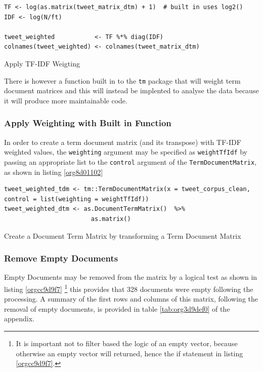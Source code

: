 \documentclass[11pt]{article}
\begin{document}
\begin{enumerate}
\begin{listing}[htbp]
\begin{verbatim}
TF <- log(as.matrix(tweet_matrix_dtm) + 1)  # built in uses log2()
IDF <- log(N/ft)

tweet_weighted           <- TF %*% diag(IDF)
colnames(tweet_weighted) <- colnames(tweet_matrix_dtm)
\end{verbatim}
\caption{\label{orged9ebd9}Apply TF-IDF Weigting}
\end{listing}

There is however a function built in to the \texttt{tm} package that will weight term document matrices and this will instead be implented to analyse the data because it will produce more maintainable code.
\end{enumerate}

\subsubsection{Apply Weighting with Built in Function}
\label{sec:orgd078ede}
In order to create a term document matrix (and its transpose) with TF-IDF weighted values, the \texttt{weighting} argument may be specified as \texttt{weightTfIdf} by passing an appropriate list to the \texttt{control} argument of the \texttt{TermDocumentMatrix}, as shown in listing \ref{org8d01102}

\begin{listing}[htbp]
\begin{verbatim}
tweet_weighted_tdm <- tm::TermDocumentMatrix(x = tweet_corpus_clean, control = list(weighting = weightTfIdf))
tweet_weighted_dtm <- as.DocumentTermMatrix()  %>%
                        as.matrix()
\end{verbatim}
\caption{\label{org8d01102}Create a Document Term Matrix by transforming a Term Document Matrix}
\end{listing}

\subsubsection{Remove Empty Documents}
\label{sec:org9da6011}
Empty Documents may be removed from the matrix by a logical test as shown in listing  \ref{orgcc9d9f7} \footnote{It is important not to filter based the logic of an empty vector, because
otherwise an empty vector will returned, hence the if statement in listing \ref{orgcc9d9f7}.} this provides that 328 documents were empty following the processing. A summary of the first rows and columns of this matrix, following the removal of empty documents, is provided in table \ref{tab:org3d9def0} of the appendix.
\end{document}
